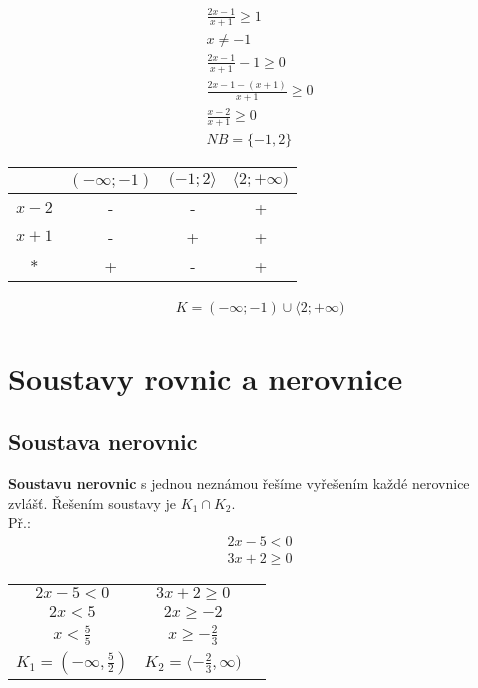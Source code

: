 \documentclass[12pt, a4paper]{article}
\begin{document}
\[
\begin{aligned}
\frac{2x-1}{x+1} \geq 1\\
x \neq -1\\
\frac{2x-1}{x+1} -1 \geq 0\\
\frac{2x-1-(x+1)}{x+1} \geq 0\\
\frac{x-2}{x+1} \geq 0\\
NB = \{-1,2\}
\end{aligned}\]

\begin{center}
\begin{tabular}{| c | c | c | c |}
\hline
 & $(-\infty;-1)$ & $(-1;2 \rangle $ & $ \langle 2;+\infty)$\\
\hline
$x-2$ & - & - & +\\
\hline
$x+1$ & - & + & +\\
\hline
$*$ & + & - & +\\
\hline
\end{tabular}
\end{center}

\[\begin{aligned}
K = (-\infty;-1) \cup \langle 2; +\infty)
\end{aligned}\]



\section{Soustavy rovnic a nerovnice}
\subsection*{Soustava nerovnic}
\textbf{Soustavu nerovnic} s jednou neznámou řešíme vyřešením každé nerovnice zvlášť. Řešením soustavy je $K_1 \cap K_2$.\\
Př.:\\
\[\begin{aligned}
2x - 5 < 0\\
3x + 2 \geq 0
\end{aligned}\]

\begin{center}
\begin{tabular}{ c c c }
$2x-5 < 0$ & $3x+2 \geq 0$\\
$2x < 5$ & $2x \geq -2$\\
$x < \frac{5}{5}$ & $x \geq -\frac{2}{3}$\\
$K_1 = (-\infty,\frac{5}{2})$ & $K_2 = \langle -\frac{2}{3}, \infty)$
\end{tabular}
\end{center}
\end{document}
